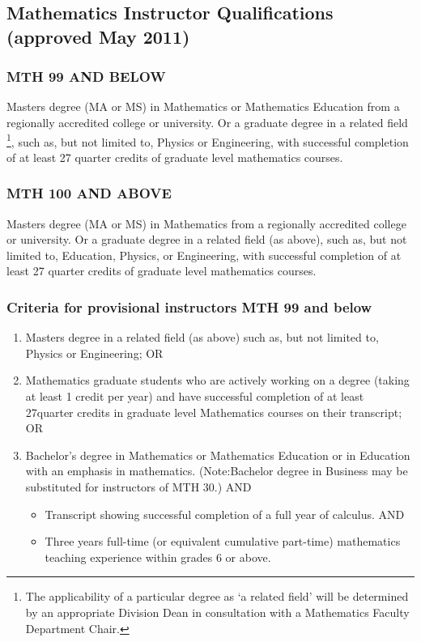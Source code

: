 \subsection{Mathematics Instructor Qualifications (approved May 2011)}
\subsubsection{MTH 99 AND BELOW}
Masters degree (MA or MS) in Mathematics or Mathematics Education from a regionally accredited college or university.  Or a graduate degree in a related field \footnote{The applicability of a particular degree as `a related field' will be determined by an appropriate Division Dean in consultation with a Mathematics Faculty Department Chair.
    }, such as, but not limited to, Physics or Engineering, with successful completion of at least 27 quarter credits of graduate level mathematics courses.
\subsubsection{MTH 100 AND ABOVE}
Masters degree (MA or MS) in Mathematics from a regionally accredited college or university.  Or a graduate degree in a related field (as above), such as, but not limited to, Education, Physics, or Engineering, with successful completion of at least 27 quarter credits of graduate level mathematics courses.
\subsubsection{Criteria for provisional instructors MTH 99 and below }
\begin{enumerate}
  \item Masters degree in a related field (as above) such as, but not limited to, Physics or Engineering; OR
  \item Mathematics graduate students who are actively working on a degree (taking at least 1 credit per year) and have successful completion of at least 27quarter credits in graduate level Mathematics courses on their transcript; OR
  \item Bachelor's degree in Mathematics or Mathematics Education or in Education with an emphasis in mathematics.  (Note:Bachelor degree in Business may be substituted for instructors of MTH 30.)
    AND 
    \begin{itemize}
      \item Transcript showing successful completion of a full year of calculus.
        AND
      \item Three years full-time (or equivalent cumulative part-time) mathematics teaching experience within grades 6 or above.
    \end{itemize}
\end{enumerate}
